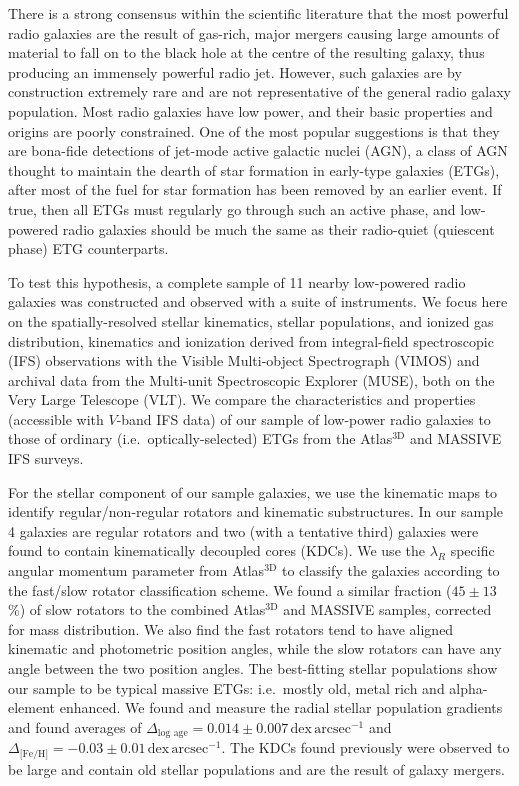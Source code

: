 \begin{abstractlong}
There is a strong consensus within the scientific literature that the most powerful radio galaxies are the result of gas-rich, major mergers causing large amounts of material to fall on to the black hole at the centre of the resulting galaxy, thus producing an immensely powerful radio jet. However, such galaxies are by construction extremely rare and are not representative of the general radio galaxy population. Most radio galaxies have low power, and their basic properties and origins are poorly constrained. One of the most popular suggestions is that they are bona-fide detections of jet-mode active galactic nuclei (AGN), a class of AGN thought to maintain the dearth of star formation in early-type galaxies (ETGs), after most of the fuel for star formation has been removed by an earlier event. If true, then all ETGs must regularly go through such an active phase, and low-powered radio galaxies should be much the same as their radio-quiet (quiescent phase) ETG counterparts. 

To test this hypothesis, a complete sample of 11 nearby low-powered radio galaxies was constructed and observed with a suite of instruments. We focus here on the spatially-resolved stellar kinematics, stellar populations, and ionized gas distribution, kinematics and ionization derived from integral-field spectroscopic (IFS) observations with the Visible Multi-object Spectrograph (VIMOS) and archival data from the Multi-unit Spectroscopic Explorer (MUSE), both on the Very Large Telescope (VLT). We compare the characteristics and properties (accessible with $V$-band IFS data) of our sample of low-power radio galaxies to those of ordinary (i.e.\ optically-selected) ETGs from the Atlas$^\text{3D}$ and MASSIVE IFS surveys.

For the stellar component of our sample galaxies, we use the kinematic maps to identify regular/non-regular rotators and kinematic substructures. In our sample 4 galaxies are regular rotators and two (with a tentative third) galaxies were found to contain kinematically decoupled cores (KDCs). We use the $\lambda_R$ specific angular momentum parameter from Atlas$^\text{3D}$ to classify the galaxies according to the fast/slow rotator classification scheme. We found a similar fraction ($45\pm13$\%) of slow rotators to the combined Atlas$^\text{3D}$ and MASSIVE samples, corrected for mass distribution. We also find the fast rotators tend to have aligned kinematic and photometric position angles, while the slow rotators can have any angle between the two position angles. The best-fitting stellar populations show our sample to be typical massive ETGs: i.e.\ mostly old, metal rich and alpha-element enhanced. We found and measure the radial stellar population gradients and found averages of $\Delta_\text{log age} = 0.014\pm0.007 \,\mathrm{dex \, arcsec^{-1}}$ and $\Delta_\text{[Fe/H]} = -0.03\pm0.01 \, \mathrm{dex \, arcsec^{-1}}$. The KDCs found previously were observed to be large and contain old stellar populations and are the result of galaxy mergers. 


\end{abstractlong}
